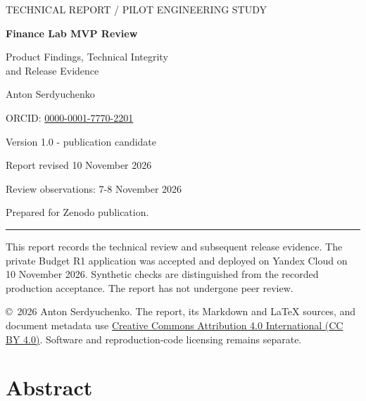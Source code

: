 \documentclass[11pt,a4paper]{article}
\begin{document}
\begin{titlepage}
\color{ink}
\vspace*{18mm}
{\large TECHNICAL REPORT / PILOT ENGINEERING STUDY\par}
\vspace{13mm}
{\Huge\bfseries Finance Lab MVP Review\par}
\vspace{6mm}
{\LARGE Product Findings, Technical Integrity\\[3pt] and Release Evidence\par}
\vspace{15mm}
{\Large Anton Serdyuchenko\par}
{\small ORCID: \href{https://orcid.org/0000-0001-7770-2201}{0000-0001-7770-2201}\par}
\vspace{6mm}
{\large Version 1.0 - publication candidate\par}
{\large Report revised 10 November 2026\par}
{\large Review observations: 7-8 November 2026\par}
\vspace{5mm}
{\small Prepared for Zenodo publication.\par}
\vfill
\begin{minipage}{0.91\textwidth}
\hrule\vspace{5mm}
This report records the technical review and subsequent release evidence.
The private Budget R1 application was accepted and deployed on Yandex Cloud
on 10 November 2026. Synthetic checks are distinguished from the recorded
production acceptance. The report has not undergone peer review.
\par\vspace{3mm}
{\small \copyright\ 2026 Anton Serdyuchenko. The report, its Markdown and LaTeX
sources, and document metadata use
\href{https://creativecommons.org/licenses/by/4.0/}{Creative Commons Attribution
4.0 International (CC BY 4.0)}. Software and reproduction-code licensing remains
separate.}
\end{minipage}
\vspace*{14mm}
\end{titlepage}
\setcounter{page}{2}
\section*{Abstract}
\end{document}

